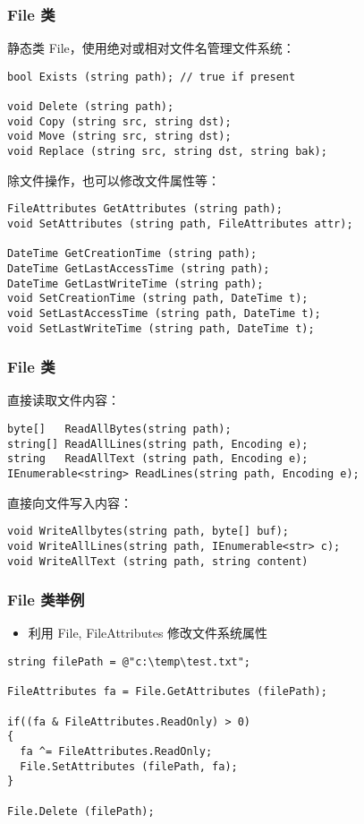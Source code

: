 \begin{frame}[fragile]
\frametitle{File 类}
静态类 File，使用绝对或相对文件名管理文件系统：
\begin{lstlisting}
bool Exists (string path); // true if present

void Delete (string path);
void Copy (string src, string dst);
void Move (string src, string dst);
void Replace (string src, string dst, string bak);
\end{lstlisting}
除文件操作，也可以修改文件属性等：
\begin{lstlisting}
FileAttributes GetAttributes (string path);
void SetAttributes (string path, FileAttributes attr);

DateTime GetCreationTime (string path); 
DateTime GetLastAccessTime (string path);
DateTime GetLastWriteTime (string path);
void SetCreationTime (string path, DateTime t);
void SetLastAccessTime (string path, DateTime t);
void SetLastWriteTime (string path, DateTime t);
\end{lstlisting}
\end{frame}

\begin{frame}[fragile]
\frametitle{File 类}
直接读取文件内容：
\begin{lstlisting}
byte[]   ReadAllBytes(string path);
string[] ReadAllLines(string path, Encoding e);
string   ReadAllText (string path, Encoding e);
IEnumerable<string> ReadLines(string path, Encoding e);
\end{lstlisting}
直接向文件写入内容：
\begin{lstlisting}
void WriteAllbytes(string path, byte[] buf);
void WriteAllLines(string path, IEnumerable<str> c);
void WriteAllText (string path, string content)
\end{lstlisting}
\end{frame}

\begin{frame}[fragile]
\frametitle{File 类举例}
\begin{itemize}
\item 利用 File, FileAttributes 修改文件系统属性
\end{itemize}
\begin{lstlisting}
string filePath = @"c:\temp\test.txt";

FileAttributes fa = File.GetAttributes (filePath);

if((fa & FileAttributes.ReadOnly) > 0)
{ 
  fa ^= FileAttributes.ReadOnly;
  File.SetAttributes (filePath, fa); 
}

File.Delete (filePath);
\end{lstlisting}
\end{frame}


